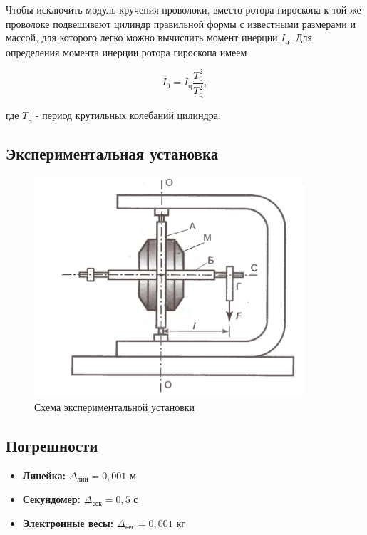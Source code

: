 \documentclass[a4paper, 12pt]{article}
\begin{document}
\begin{center}
Чтобы исключить модуль кручения проволоки, вместо ротора гироскопа к той же проволоке подвешивают цилиндр правильной формы с известными размерами и массой, для которого легко можно вычислить момент инерции $ I_\text{ц} $. Для определения момента инерции ротора гироскопа имеем 

    \begin{equation}
        I_0=I_\text{ц}\frac{T_0^2}{T_\text{ц}^2},
        \label{ten}
    \end{equation}


\bigskip

где $ T_\text{ц} $ - период крутильных колебаний цилиндра.
\end{center}

    \subsection*{\centering Экспериментальная установка}   

\bigskip

    \begin{figure}[H]
    	\centering\includegraphics[width=10cm]{ustanovka.png}
    	\caption{Схема экспериментальной установки}
    	\label{ustanovka}
    \end{figure}

\newpage
\begin{center}
\subsection*{Погрешности}

    \begin{itemize}
	\item \textbf{Линейка:} $ \Delta_\text{лин} = 0,001 $ м
	\item \textbf{Секундомер:} $ \Delta_\text{сек} = 0,5 $ с 
	\item \textbf{Электронные весы:} $ \Delta_\text{вес} = 0,001 $ кг
\end{itemize}

\end{center}
\end{document}
